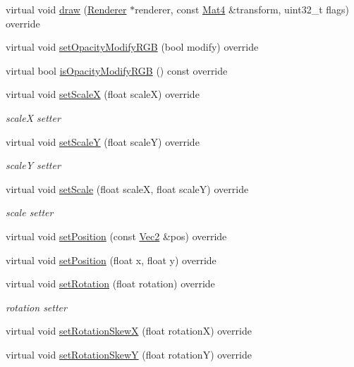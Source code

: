 \begin{Indent}
\begin{DoxyCompactItemize}
virtual void \hyperlink{classSprite_a033c570c383dbab72ca2bc9ccdffb3b9}{draw} (\hyperlink{classRenderer}{Renderer} $\ast$renderer, const \hyperlink{classMat4}{Mat4} \&transform, uint32\+\_\+t flags) override
\item 
virtual void \hyperlink{classSprite_adf41c2705eb6b1317a14c469c84da78c}{set\+Opacity\+Modify\+R\+GB} (bool modify) override
\item 
virtual bool \hyperlink{classSprite_a00d162b3e55fc5acd56e5c3e48bc0a97}{is\+Opacity\+Modify\+R\+GB} () const override
\item 
virtual void \hyperlink{classSprite_af688d9902835f46c9690b29ab5a001a3}{set\+ScaleX} (float scaleX) override
\begin{DoxyCompactList}\small\item\em scaleX setter \end{DoxyCompactList}\item 
virtual void \hyperlink{classSprite_ab7e7db21d5cd13269074fde7195fa3e2}{set\+ScaleY} (float scaleY) override
\begin{DoxyCompactList}\small\item\em scaleY setter \end{DoxyCompactList}\item 
virtual void \hyperlink{classSprite_a52e1d2937d38baf4ad067f029e33b901}{set\+Scale} (float scaleX, float scaleY) override
\begin{DoxyCompactList}\small\item\em scale setter \end{DoxyCompactList}\item 
virtual void \hyperlink{classSprite_a0c950da6338ba62938d7b2af6eea8b39}{set\+Position} (const \hyperlink{classVec2}{Vec2} \&pos) override
\item 
virtual void \hyperlink{classSprite_aaef708324799384499b67c1721ad36d1}{set\+Position} (float x, float y) override
\item 
virtual void \hyperlink{classSprite_a456ab327b49e657c504cb41ce3f0bd77}{set\+Rotation} (float rotation) override
\begin{DoxyCompactList}\small\item\em rotation setter \end{DoxyCompactList}\item 
virtual void \hyperlink{classSprite_adcc286e6eb86f3fd6242de9cdf321301}{set\+Rotation\+SkewX} (float rotationX) override
\item 
virtual void \hyperlink{classSprite_a5f3af508d1f9e146ac93c0eaad44dfb1}{set\+Rotation\+SkewY} (float rotationY) override

\end{DoxyCompactItemize}
\end{Indent}
